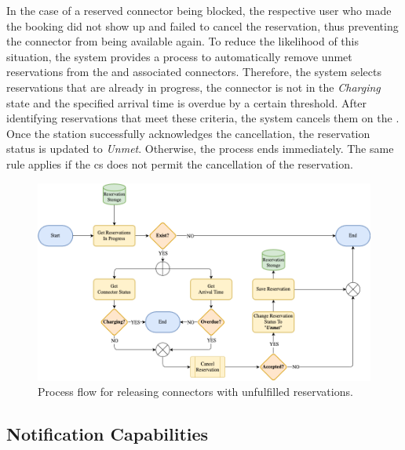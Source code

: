 In the case of a reserved connector being blocked, the respective user who made the booking did not show up and failed to cancel the reservation, thus preventing the connector from being available again.
To reduce the likelihood of this situation, the system provides a process to automatically remove unmet reservations from the  and associated connectors.
Therefore, the system selects reservations that are already in progress, the connector is not in the \textit{Charging} state and the specified arrival time is overdue by a certain threshold.
After identifying reservations that meet these criteria, the system cancels them on the . Once the station successfully acknowledges the cancellation, the reservation status is updated to \textit{Unmet}.
Otherwise, the process ends immediately. The same rule applies if the \acrshort{cs} does not permit the cancellation of the reservation.

\begin{figure}[h]
    \centering
    \includegraphics[scale=0.4]{resources/images/main/5_design/processes/scheduler/CancelUnmetReservation.png}
    \caption{Process flow for releasing connectors with unfulfilled reservations.}
    \label{fig:free-connector-flowchart}
\end{figure}

\newpage

\subsection{Notification Capabilities}
\label{ch:Design:sec:Reservation System:ssec:Notification Capabilities}

